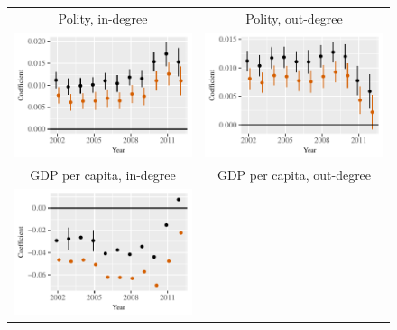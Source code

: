 \documentclass[reqno,onecolumn,letterpaper,12pt]{article}
\begin{document}
\begin{figure}[htp]
\centering
\begin{tabular}{c@{\hskip -.4cm}c}
Polity, in-degree &
Polity, out-degree\\
\includegraphics[height=.2\textheight, clip=true, trim=0cm .5cm 0cm .1cm]{draft_figures/rl_plots/Polity_in.pdf}   &
\includegraphics[height=.2\textheight, clip=true, trim=.5cm .5cm 0cm .1cm]{draft_figures/rl_plots/Polity_out.pdf}   \\
GDP per capita, in-degree &
GDP per capita,  out-degree\\
\includegraphics[height=.2\textheight, clip=true, trim=0cm .5cm 0cm .1cm]{draft_figures/rl_plots/GDPpc_in.pdf} &

\end{tabular}
\end{figure}
\end{document}
